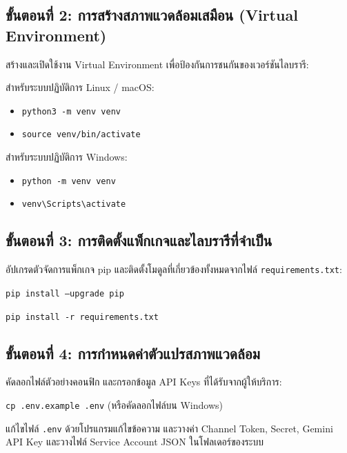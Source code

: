 \subsection{ขั้นตอนที่ 2: การสร้างสภาพแวดล้อมเสมือน (Virtual Environment)}
\hspace*{1.3em}
สร้างและเปิดใช้งาน Virtual Environment เพื่อป้องกันการชนกันของเวอร์ชันไลบรารี:
\begin{mycustomitem}
\item สำหรับระบบปฏิบัติการ Linux / macOS:
  \begin{itemize}[leftmargin=2em]
    \item \texttt{python3 -m venv venv}
    \item \texttt{source venv/bin/activate}
  \end{itemize}
\item สำหรับระบบปฏิบัติการ Windows:
  \begin{itemize}[leftmargin=2em]
    \item \texttt{python -m venv venv}
    \item \texttt{venv\textbackslash Scripts\textbackslash activate}
  \end{itemize}
\end{mycustomitem}

\subsection{ขั้นตอนที่ 3: การติดตั้งแพ็กเกจและไลบรารีที่จำเป็น}
\hspace*{1.3em}
อัปเกรดตัวจัดการแพ็กเกจ pip และติดตั้งโมดูลที่เกี่ยวข้องทั้งหมดจากไฟล์ \texttt{requirements.txt}:
\begin{mycustomitem}
\item \texttt{pip install --upgrade pip}
\item \texttt{pip install -r requirements.txt}
\end{mycustomitem}

\subsection{ขั้นตอนที่ 4: การกำหนดค่าตัวแปรสภาพแวดล้อม}
\hspace*{1.3em}
คัดลอกไฟล์ตัวอย่างคอนฟิก และกรอกข้อมูล API Keys ที่ได้รับจากผู้ให้บริการ:
\begin{mycustomitem}
\item \texttt{cp .env.example .env} (หรือคัดลอกไฟล์บน Windows)
\item แก้ไขไฟล์ \texttt{.env} ด้วยโปรแกรมแก้ไขข้อความ และวางค่า Channel Token, Secret, Gemini API Key และวางไฟล์ Service Account JSON ในโฟลเดอร์ของระบบ
\end{mycustomitem}

